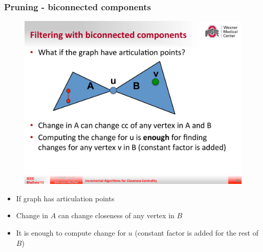 \begin{frame}
  \frametitle{Pruning - biconnected components}

  \begin{figure}[H]
    \centering
    \includegraphics[width=\textwidth, height=0.5\textheight, keepaspectratio]{imgs/sksc-biconnected}
  \end{figure}

  \begin{itemize}
    \item If graph has articulation points
    \item Change in $A$ can change closeness of any vertex in $B$
    \item It is enough to compute change for $u$ (constant factor is added for the rest of $B$)
  \end{itemize}
\end{frame}


